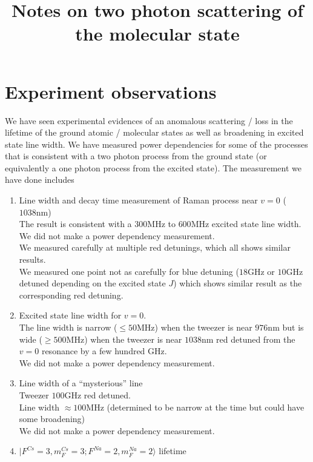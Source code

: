 \documentclass[10pt,fleqn]{article}
\title{Notes on two photon scattering of the molecular state}
\begin{document}
\maketitle

\section{Experiment observations}
We have seen experimental evidences of an anomalous scattering / loss in the
lifetime of the ground atomic / molecular states as well as broadening in excited state
line width. We have measured power dependencies for some of the processes that is
consistent with a two photon process from the ground state (or equivalently a one
photon process from the excited state). The measurement we have done includes

\begin{enumerate}
\item Line width and decay time measurement of Raman process near $v=0$ ($1038 \mathrm{nm}$)\\
  The result is consistent with a $300 \mathrm{MHz}$ to $600 \mathrm{MHz}$
  excited state line width.\\
  We did not make a power dependency measurement.\\
  We measured carefully at multiple red detunings, which all shows similar results.\\
  We measured one point not as carefully for blue detuning
  ($18 \mathrm{GHz}$ or $10 \mathrm{GHz}$ detuned depending on the excited state $J$)
  which shows similar result as the corresponding red detuning.
\item Excited state line width for $v=0$.\\
  The line width is narrow ($\leqslant 50 \mathrm{MHz}$)
  when the tweezer is near $976 \mathrm{nm}$ but is wide ($\geqslant 500 \textrm{MHz}$)
  when the tweezer is near $1038 \mathrm{nm}$ red detuned from the $v=0$ resonance
  by a few hundred GHz.\\
  We did not make a power dependency measurement.
\item Line width of a ``mysterious'' line\\
  Tweezer $100 \mathrm{GHz}$ red detuned.\\
  Line width $\approx 100 \mathrm{MHz}$
  (determined to be narrow at the time but could have some broadening)\\
  We did not make a power dependency measurement.
\item $|F^{Cs}=3, m_{F}^{Cs}=3; F^{Na}=2, m_{F}^{Na}=2\rangle$ lifetime

\end{enumerate}
\end{document}
